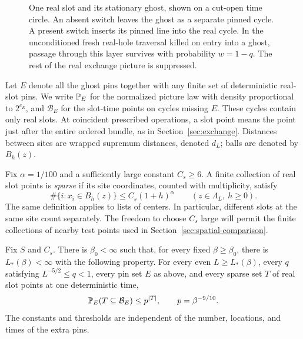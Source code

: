 \begin{figure}[ht]
 \centering
 
 \caption{One real slot and its stationary ghost, shown on a cut-open
 time circle.  An absent switch leaves the ghost as a separate pinned
 cycle.  A present switch inserts its pinned line into the real cycle.
 In the unconditioned fresh real-hole traversal killed on entry into a ghost, passage through
 this layer survives with probability \(w=1-q\).  The rest of the
 real exchange picture is suppressed.}
 \label{fig:sparse-ghost}
\end{figure}

Let \(E\) denote all the ghost pins together with any finite set of
deterministic real-slot pins.  We write \(\mathbb P_E\) for the normalized
picture law with density proportional to \(2^{c_E}\), and
\(\mathcal B_E\) for the slot-time points on cycles missing \(E\).
These cycles contain only real slots.  At coincident prescribed
operations, a slot point means the point just after the entire ordered
bundle, as in Section~\ref{sec:exchange}.  Distances
between sites are wrapped supremum distances, denoted \(d_L\); balls
are denoted by \(B_h(z)\).

Fix \(\alpha=1/100\) and a sufficiently large constant \(C_s\ge6\).
A finite collection of real slot points is \emph{sparse} if its site
coordinates, counted with multiplicity, satisfy
\begin{equation}\label{eq:torus-sparse}
 \#\{i:x_i\in B_h(z)\}\le C_s(1+h)^\alpha
 \qquad(z\in\Lambda_L,\ h\ge0).
\end{equation}
The same definition applies to lists of centers.  In particular,
different slots at the same site count separately.  The freedom to
choose \(C_s\) large will permit the finite collections of nearby
test points used in Section~\ref{sec:spatial-comparison}.

\begin{proposition}\label{prop:sparse-pins}
Fix \(S\) and \(C_s\).  There is \(\beta_0<\infty\) such that, for
every fixed \(\beta\ge\beta_0\), there is \(L_*(\beta)<\infty\)
with the following property.  For every even \(L\ge L_*(\beta)\),
every \(q\) satisfying \(L^{-5/2}\le q<1\), every pin set \(E\)
as above, and every sparse set \(T\) of real slot points at one
deterministic time,
\begin{equation}\label{eq:sparse-pins}
 \mathbb P_E(T\subseteq\mathcal B_E)\le p^{|T|},
 \qquad p=\beta^{-9/10}.
\end{equation}
The constants and thresholds are independent of the number, locations,
and times of the extra pins.
\end{proposition}

